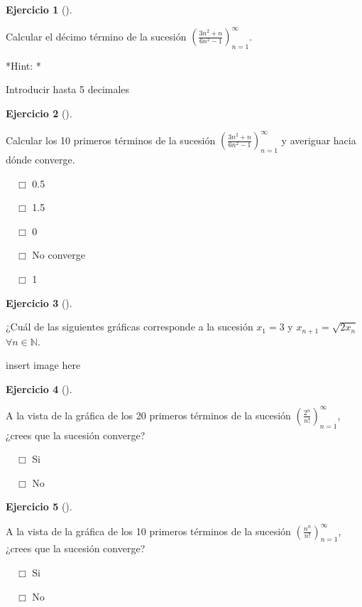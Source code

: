 \documentclass[
  a4paper,
]{scrreport}
\theoremstyle{definition}
\newtheorem{exercise}{Ejercicio}[chapter]
\theoremstyle{remark}
\begin{document}
\leavevmode{}%
\begin{exercise}[]\label{exr-sucesiones-propuesto-1}

Calcular el décimo término de la sucesión
\(\left(\frac{3n^2+n}{6n^2-1}\right)_{n=1}^\infty\).

\vspace{18pt}*Hint: *

Introducir hasta 5 decimales

\end{exercise}

\leavevmode{}%
\begin{exercise}[]\label{exr-sucesiones-propuesto-2}

Calcular los 10 primeros términos de la sucesión
\(\left(\frac{3n^2+n}{6n^2-1}\right)_{n=1}^\infty\) y averiguar hacia
dónde converge.

${\quad\Box}$ 0.5

${\quad\Box}$ 1.5

${\quad\Box}$ 0

${\quad\Box}$ No converge

${\quad\Box}$ 1

\end{exercise}

\leavevmode{}%
\begin{exercise}[]\label{exr-sucesiones-propuesto-3}

¿Cuál de las siguientes gráficas corresponde a la sucesión \(x_1=3\) y
\(x_{n+1}=\sqrt{2x_n}\) \(\forall n\in\mathbb{N}\).

insert image here

\end{exercise}

\leavevmode{}%
\begin{exercise}[]\label{exr-sucesiones-propuesto-4}

A la vista de la gráfica de los 20 primeros términos de la sucesión
\(\left(\frac{2^n}{n!}\right)_{n=1}^\infty\), ¿crees que la sucesión
converge?

${\quad\Box}$ Si

${\quad\Box}$ No

\end{exercise}

\leavevmode{}%
\begin{exercise}[]\label{exr-sucesiones-propuesto-5}

A la vista de la gráfica de los 10 primeros términos de la sucesión
\(\left(\frac{n^n}{n!}\right)_{n=1}^\infty\), ¿crees que la sucesión
converge?

${\quad\Box}$ Si

${\quad\Box}$ No

\end{exercise}
\end{document}
